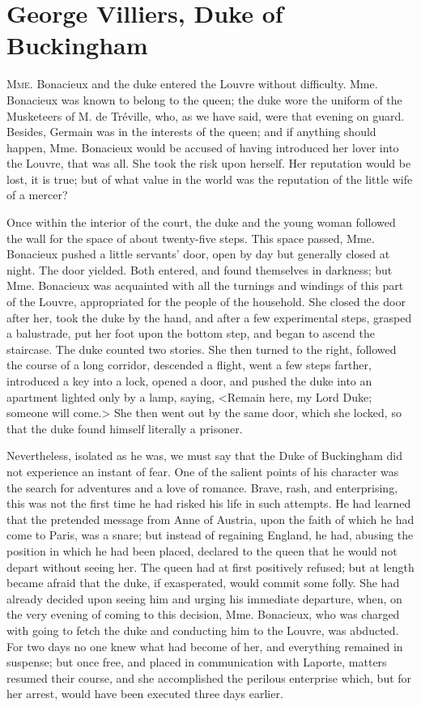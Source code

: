 
\chapter{George Villiers, Duke of Buckingham}

\lettrine[]{M}{me}. Bonacieux and the duke entered the Louvre without difficulty. Mme. Bonacieux was known to belong to the queen; the duke wore the uniform of the Musketeers of M. de Tréville, who, as we have said, were that evening on guard. Besides, Germain was in the interests of the queen; and if anything should happen, Mme. Bonacieux would be accused of having introduced her lover into the Louvre, that was all. She took the risk upon herself. Her reputation would be lost, it is true; but of what value in the world was the reputation of the little wife of a mercer? 

Once within the interior of the court, the duke and the young woman followed the wall for the space of about twenty-five steps. This space passed, Mme. Bonacieux pushed a little servants' door, open by day but generally closed at night. The door yielded. Both entered, and found themselves in darkness; but Mme. Bonacieux was acquainted with all the turnings and windings of this part of the Louvre, appropriated for the people of the household. She closed the door after her, took the duke by the hand, and after a few experimental steps, grasped a balustrade, put her foot upon the bottom step, and began to ascend the staircase. The duke counted two stories. She then turned to the right, followed the course of a long corridor, descended a flight, went a few steps farther, introduced a key into a lock, opened a door, and pushed the duke into an apartment lighted only by a lamp, saying, <Remain here, my Lord Duke; someone will come.> She then went out by the same door, which she locked, so that the duke found himself literally a prisoner. 

Nevertheless, isolated as he was, we must say that the Duke of Buckingham did not experience an instant of fear. One of the salient points of his character was the search for adventures and a love of romance. Brave, rash, and enterprising, this was not the first time he had risked his life in such attempts. He had learned that the pretended message from Anne of Austria, upon the faith of which he had come to Paris, was a snare; but instead of regaining England, he had, abusing the position in which he had been placed, declared to the queen that he would not depart without seeing her. The queen had at first positively refused; but at length became afraid that the duke, if exasperated, would commit some folly. She had already decided upon seeing him and urging his immediate departure, when, on the very evening of coming to this decision, Mme. Bonacieux, who was charged with going to fetch the duke and conducting him to the Louvre, was abducted. For two days no one knew what had become of her, and everything remained in suspense; but once free, and placed in communication with Laporte, matters resumed their course, and she accomplished the perilous enterprise which, but for her arrest, would have been executed three days earlier. 

